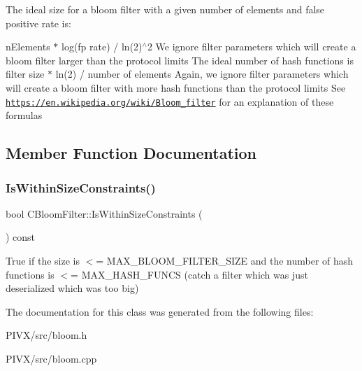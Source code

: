 The ideal size for a bloom filter with a given number of elements and false positive rate is\+:
\begin{DoxyItemize}
\item n\+Elements $\ast$ log(fp rate) / ln(2)$^\wedge$2 We ignore filter parameters which will create a bloom filter larger than the protocol limits The ideal number of hash functions is filter size $\ast$ ln(2) / number of elements Again, we ignore filter parameters which will create a bloom filter with more hash functions than the protocol limits See \href{https://en.wikipedia.org/wiki/Bloom_filter}{\tt https\+://en.\+wikipedia.\+org/wiki/\+Bloom\+\_\+filter} for an explanation of these formulas 
\end{DoxyItemize}

\subsection{Member Function Documentation}
\mbox{\label{class_c_bloom_filter_a06f2094da8e7d9c6ad4ea426858e32de}} 
\subsubsection{\texorpdfstring{Is\+Within\+Size\+Constraints()}{IsWithinSizeConstraints()}}
{\footnotesize\ttfamily bool C\+Bloom\+Filter\+::\+Is\+Within\+Size\+Constraints (\begin{DoxyParamCaption}{ }\end{DoxyParamCaption}) const}

True if the size is $<$= M\+A\+X\+\_\+\+B\+L\+O\+O\+M\+\_\+\+F\+I\+L\+T\+E\+R\+\_\+\+S\+I\+ZE and the number of hash functions is $<$= M\+A\+X\+\_\+\+H\+A\+S\+H\+\_\+\+F\+U\+N\+CS (catch a filter which was just deserialized which was too big) 

The documentation for this class was generated from the following files\+:\begin{DoxyCompactItemize}
\item 
P\+I\+V\+X/src/bloom.\+h\item 
P\+I\+V\+X/src/bloom.\+cpp\end{DoxyCompactItemize}
